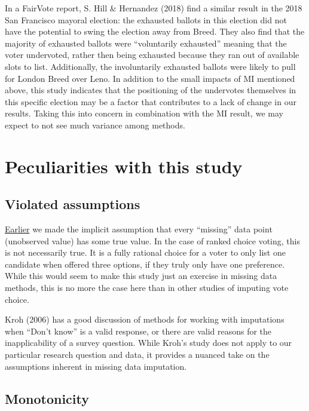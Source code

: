 \documentclass[12pt,twoside]{reedthesis}
\begin{document}
In a FairVote report, S. Hill \& Hernandez (2018) find a similar result in the 2018 San Francisco mayoral election: the exhausted ballots in this election did not have the potential to swing the election away from Breed. They also find that the majority of exhausted ballots were ``voluntarily exhausted'' meaning that the voter undervoted, rather then being exhausted because they ran out of available slots to list. Additionally, the involuntarily exhausted ballots were likely to pull for London Breed over Leno. In addition to the small impacts of MI mentioned above, this study indicates that the positioning of the undervotes themselves in this specific election may be a factor that contributes to a lack of change in our results. Taking this into concern in combination with the MI result, we may expect to not see much variance among methods.

\hypertarget{peculiarities-with-this-study}{%
\section{Peculiarities with this study}\label{peculiarities-with-this-study}}

\hypertarget{violated-assumptions}{%
\subsection{Violated assumptions}\label{violated-assumptions}}

\protect\hyperlink{missing-data}{Earlier} we made the implicit assumption that every ``missing'' data point (unobserved value) has some true value. In the case of ranked choice voting, this is not necessarily true. It is a fully rational choice for a voter to only list one candidate when offered three options, if they truly only have one preference. While this would seem to make this study just an exercise in missing data methods, this is no more the case here than in other studies of imputing vote choice.

Kroh (2006) has a good discussion of methods for working with imputations when ``Don't know'' is a valid response, or there are valid reasons for the inapplicability of a survey question. While Kroh's study does not apply to our particular research question and data, it provides a nuanced take on the assumptions inherent in missing data imputation.

\hypertarget{monotonicity}{%
\subsection{Monotonicity}\label{monotonicity}}
\end{document}
